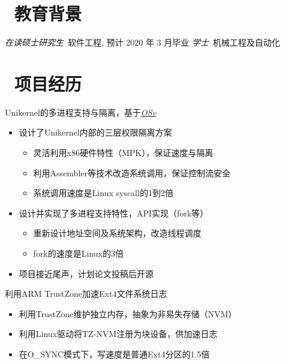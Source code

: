 \documentclass{resume}
\begin{document}


 
\section{\faGraduationCap\  教育背景}
\textit{在读硕士研究生}\ 软件工程, 预计 2020 年 3 月毕业
\textit{学士}\ 机械工程及自动化

\vspace{1.5ex}
\section{\faUsers\  项目经历}
Unikernel的多进程支持与隔离，基于\href{https://http://osv.io/}{\emph{OSv}}
\begin{itemize}
  \item 设计了Unikernel内部的三层权限隔离方案
  \begin{itemize}
    \item 灵活利用x86硬件特性（MPK），保证速度与隔离
    \item 利用Assembler等技术改造系统调用，保证控制流安全
    \item 系统调用速度是Linux syscall的1到2倍
  \end{itemize}
  \item 设计并实现了多进程支持特性，API实现（fork等）
  \begin{itemize}
    \item 重新设计地址空间及系统架构，改造线程调度
    \item fork的速度是Linux的3倍
  \end{itemize}
  \item 项目接近尾声，计划论文投稿后开源
\end{itemize}

利用ARM TrustZone加速Ext4文件系统日志
\begin{itemize}
  \item 利用TrustZone维护独立内存，抽象为非易失存储（NVM）
  \item 利用Linux驱动将TZ-NVM注册为块设备，供加速日志
  \item 在O\_SYNC模式下，写速度是普通Ext4分区的1.5倍
\end{itemize}
\end{document}
